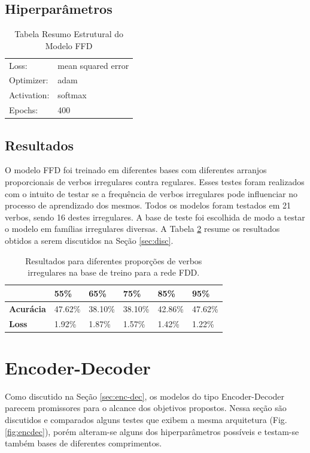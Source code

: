 \subsection{Hiperparâmetros}

\begin{table}[H]
\centering
\begin{tabular}{ll}
Loss: & mean squared error \\
Optimizer: & adam \\
Activation: & softmax \\
Epochs: & 400 \\
\end{tabular}
\caption{Tabela Resumo Estrutural do Modelo FFD}
\label{tab:res1}
\end{table}

\subsection{Resultados}

O modelo FFD foi treinado em diferentes bases com diferentes arranjos proporcionais de verbos irregulares contra regulares. Esses testes foram realizados com o intuito de testar se a frequência de verbos irregulares pode influenciar no processo de aprendizado dos mesmos. Todos os modelos foram testados em 21 verbos, sendo 16 destes irregulares. A base de teste foi escolhida de modo a testar o modelo em famílias irregulares diversas. A Tabela \ref{tab:resultadosfdd} resume os resultados obtidos a serem discutidos na Seção \ref{sec:disc}.

\begin{table}[H]
\centering
\begin{tabular}{llllll}
 & \textbf{55\%} & \textbf{65\%} & \textbf{75\%} & \textbf{85\%} & \textbf{95\%} \\ \hline
\textbf{Acurácia} & 47.62\% & 38.10\% & 38.10\% & 42.86\% & 47.62\% \\
\textbf{Loss} & 1.92\% & 1.87\% & 1.57\% & 1.42\% & 1.22\%
\end{tabular}
\caption{Resultados para diferentes proporções de verbos irregulares na base de treino para a rede FDD.}
\label{tab:resultadosfdd}
\end{table}

\section{Encoder-Decoder}
\label{sec:seq2seq}

Como discutido na Seção \ref{sec:enc-dec}, os modelos do tipo Encoder-Decoder parecem promissores para o alcance dos objetivos propostos. Nessa seção são discutidos e comparados alguns testes que exibem a mesma arquitetura (Fig. \ref{fig:encdec}), porém alteram-se alguns dos hiperparâmetros possíveis e testam-se também bases de diferentes comprimentos.

